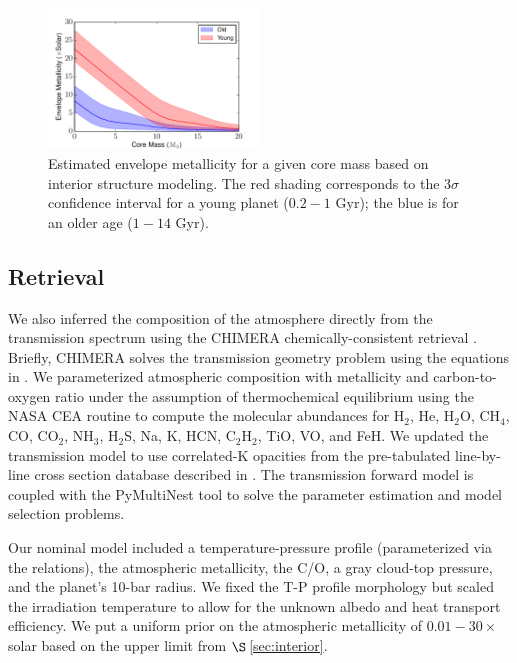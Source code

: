 \documentclass[twocolumn]{aastex61}
\begin{document}
\begin{figure}
\includegraphics[width = 0.5\textwidth]{Figures/metalByAge.pdf}
\caption{Estimated envelope metallicity for a given core mass based on interior structure modeling. The red shading corresponds to the $3\sigma$ confidence interval for a young planet ($0.2-1$ Gyr); the blue is for an older age ($1-14$ Gyr).}
\label{fig:metal_prior}
\end{figure}

\subsection{Retrieval}
\label{sec:retrieval}
We also inferred the composition of the atmosphere directly from the transmission spectrum using the CHIMERA chemically-consistent retrieval \citep{line13a, kreidberg15b}.   Briefly, CHIMERA solves the transmission geometry problem using the equations in \cite{brown01, tinetti12}.  We parameterized atmospheric composition with metallicity and carbon-to-oxygen ratio under the assumption of thermochemical equilibrium using the NASA CEA routine \citep{gordon94} to compute the molecular abundances for H$_2$, He, H$_2$O, CH$_4$, CO, CO$_2$, NH$_3$, H$_2$S, Na, K, HCN, C$_2$H$_2$, TiO, VO, and FeH.    We updated the transmission model to use correlated-K opacities \citep{lacis91, molliere15, amundsen16} from the pre-tabulated line-by-line cross section database described in \cite{freedman14}. The transmission forward model is coupled with the PyMultiNest tool \citep{buchner16} to solve the parameter estimation and model selection problems.  

Our nominal model included a temperature-pressure profile (parameterized via the \citealt{guillot10} relations), the atmospheric metallicity, the C/O, a gray cloud-top pressure, and the planet's 10-bar radius.  We fixed the T-P profile morphology but scaled the irradiation temperature to allow for the unknown albedo and heat transport efficiency.  We put a uniform prior on the atmospheric metallicity of $0.01 - 30\times$ solar based on the upper limit from $\S$\,\ref{sec:interior}.  
\end{document}
